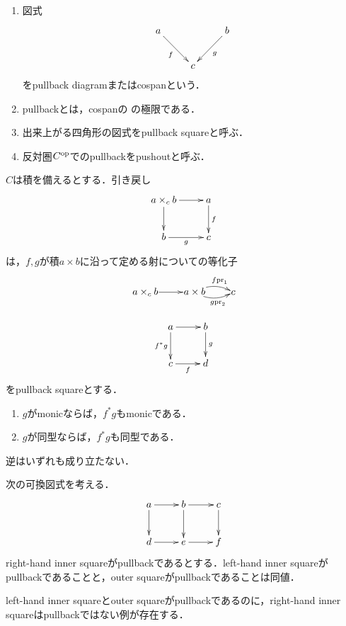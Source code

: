 \documentclass[uplatex,dvipdfmx]{jsreport}
\begin{document}
\begin{definition}\mbox{}
    \begin{enumerate}
        \item 図式
        \[\xymatrix{
            a\ar[dr]_-f&&b\ar[dl]^-g\\
            &c
        }\]
        をpullback diagramまたはcospanという．
        \item pullbackとは，cospanの
        の極限である．
        \item 出来上がる四角形の図式をpullback squareと呼ぶ．
        \item 反対圏$C^{\mathrm{op}}$でのpullbackをpushoutと呼ぶ．
    \end{enumerate}
\end{definition}

\begin{proposition}[等化子としての特徴付け]
    $C$は積を備えるとする．引き戻し
    \[\xymatrix{
        a\times_cb\ar[r]\ar[d]&a\ar[d]^-f\\
        b\ar[r]_-g&c
    }\]
    は，$f,g$が積$a\times b$に沿って定める射についての等化子
    \[\xymatrix@1{
        a\times_cb\ar[r]&a\times b\ar@/^/[r]^-{f\pr_1}\ar@/_/[r]_-{g\pr_2}&c
    }\]
\end{proposition}

\begin{proposition}
    \[\xymatrix{
        a\ar[r]\ar[d]_-{f^*g}&b\ar[d]^-g\\
        c\ar[r]_-f&d
    }\]
    をpullback squareとする．
    \begin{enumerate}
        \item $g$がmonicならば，$f^*g$もmonicである．
        \item $g$が同型ならば，$f^*g$も同型である．
    \end{enumerate}
    逆はいずれも成り立たない．
\end{proposition}

\begin{proposition}
    次の可換図式を考える．
    \[\xymatrix{
        a\ar[r]\ar[d]&b\ar[r]\ar[d]&c\ar[d]\\
        d\ar[r]&e\ar[r]&f
    }\]
    right-hand inner squareがpullbackであるとする．left-hand inner squareがpullbackであることと，outer squareがpullbackであることは同値．
\end{proposition}
\begin{remark}
    left-hand inner squareとouter squareがpullbackであるのに，right-hand inner squareはpullbackではない例が存在する．
\end{remark}
\end{document}
